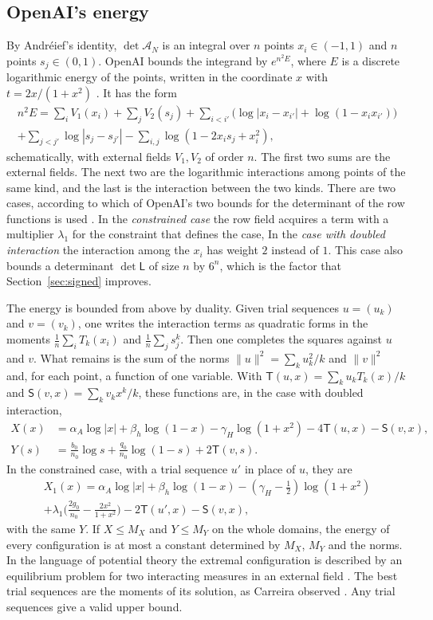 \documentclass[11pt]{amsart}
\theoremstyle{definition}
\theoremstyle{remark}
\numberwithin{equation}{section}
\newcommand{\cA}{\mathcal A}
\begin{document}
\subsection{OpenAI's energy}\label{ssec:energy}
By Andr\'eief's identity, $\det\cA_N$ is an integral over $n$ points $x_i\in(-1,1)$ and $n$ points
$s_j\in(0,1)$. OpenAI bounds the integrand by $e^{n^2E}$, where $E$ is a discrete logarithmic energy of the
points, written in the coordinate $x$ with $t=2x/(1+x^2)$ \cite[\S5]{OpenAI2026}. It has the form
\begin{multline*}
 n^2E=\sum_iV_1(x_i)+\sum_jV_2(s_j)+\sum_{i<i'}\bigl(\log|x_i-x_{i'}|+\log(1-x_ix_{i'})\bigr)\\
 +\sum_{j<j'}\log|s_j-s_{j'}|-\sum_{i,j}\log(1-2x_is_j+x_i^2),
\end{multline*}
schematically, with external fields $V_1,V_2$ of order $n$. The first two sums are the
external fields. The next two are the logarithmic interactions among points of the same kind, and the last
is the interaction between the two kinds. There are two cases, according to which of OpenAI's two bounds for
the determinant of the row functions is used \cite[Props.~5.2, 5.3]{OpenAI2026}. In the \emph{constrained
case} the row field acquires a term with a multiplier $\lambda_1$ for the constraint that defines the case,
In the \emph{case with doubled interaction} the interaction among the $x_i$ has weight $2$ instead of $1$. This case also bounds a determinant
$\det\mathsf L$ of size $n$ by $6^n$, which is the factor that Section~\ref{sec:signed} improves.

The energy is bounded from above by duality. Given trial sequences $u=(u_k)$ and $v=(v_k)$, one writes the
interaction terms as quadratic forms in the moments $\frac1n\sum_iT_k(x_i)$ and $\frac1n\sum_js_j^k$. Then one
completes the squares against $u$ and $v$. What remains is the sum of the norms $\|u\|^2=\sum_ku_k^2/k$ and
$\|v\|^2$ and, for each point, a function of one variable. With $\mathsf T(u,x)=\sum_ku_kT_k(x)/k$ and
$\mathsf S(v,x)=\sum_kv_kx^k/k$, these functions are, in the case with doubled interaction,
\begin{align*}
 X(x)&=\alpha_A\log|x|+\beta_h\log(1-x)-\gamma_H\log(1+x^2)-4\mathsf T(u,x)-\mathsf S(v,x),\\
 Y(s)&=\tfrac{b_0}{n_0}\log s+\tfrac{q_0}{n_0}\log(1-s)+2\mathsf T(v,s).
\end{align*}
In the constrained case, with a trial sequence $u'$ in place of $u$, they are
\begin{multline*}
 X_1(x)=\alpha_A\log|x|+\beta_h\log(1-x)-(\gamma_H-\tfrac12)\log(1+x^2)\\
 +\lambda_1\bigl(\tfrac{2g_0}{n_0}-\tfrac{2x^2}{1+x^2}\bigr)-2\mathsf T(u',x)-\mathsf S(v,x),
\end{multline*}
with the same $Y$. If $X\le M_X$ and $Y\le M_Y$ on the whole domains, the energy of every configuration is at
most a constant determined by $M_X$, $M_Y$ and the norms. In the language of potential theory the extremal
configuration is described by an equilibrium problem for two interacting measures in an external field
\cite{SaffTotik}. The best trial sequences are the moments of its solution, as Carreira observed
\cite{Carreira2026}. Any trial sequences give a valid upper bound.
\end{document}
